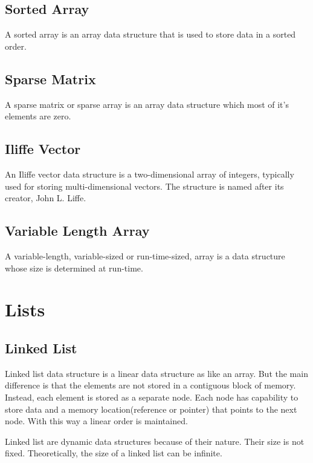 \documentclass{book}
\begin{document}
\subsection{Sorted Array}

A sorted array is an array data structure that is used to store data in a sorted order. 

\subsection{Sparse Matrix}

A sparse matrix or sparse array is an array data structure which most of it's elements are zero.

\subsection{Iliffe Vector}

An Iliffe vector data structure is a two-dimensional array of integers, typically used for storing multi-dimensional vectors. The structure is named after its creator, John L. Liffe.

\subsection{Variable Length Array}

A variable-length, variable-sized or run-time-sized, array is a data structure whose size is determined at run-time.

\section{Lists}

\subsection{Linked List}

Linked list data structure is a linear data structure as like an array. But the main difference is that the elements are not stored in a contiguous block of memory. Instead, each element is stored as a separate node. Each node has capability to store data and a memory location(reference or pointer) that points to the next node. With this way a linear order is maintained.


\noindent Linked list are dynamic data structures because of their nature. Their size is not fixed. Theoretically, the size of a linked list can be infinite.
\end{document}
